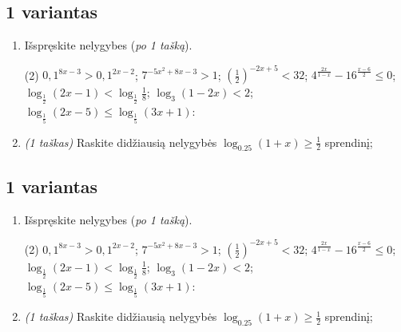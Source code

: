\documentclass[a4paper]{article}
\begin{document}
\vspace*{6mm}

\subsection*{1 variantas}

\begin{enumerate}
      \item Išspręskite nelygybes (\textit{po 1 tašką}).

            \begin{tasks}[item-format={\normalfont}, after-item-skip=2mm](2)
                  \task $0,1^{8x-3}>0,1^{2x-2}$;
                  \task $7^{-5x^2+8x-3}>1$;
                  \task $(\frac{1}{2})^{-2x+5}<32$;
                  \task $4^{\frac{2x}{1-x}}-16^{\frac{x-6}{2}} \leqslant 0$;
                  \task $\log_{\frac{1}{2}}(2x-1)<\log_{\frac{1}{2}}\frac{1}{8}$;
                  \task $\log_{3}(1-2x)<2$;
                  \task $\log_{\frac{1}{5}}(2x-5) \leqslant \log_{\frac{1}{5}}(3x+1)$:
            \end{tasks}

      \item \textit{(1 taškas)} Raskite didžiausią nelygybės $\log_{0.25}(1+x) \geqslant \frac{1}{2}$ sprendinį;

\end{enumerate}

\vspace*{6mm}

\subsection*{1 variantas}

\begin{enumerate}
      \item Išspręskite nelygybes (\textit{po 1 tašką}).

            \begin{tasks}[item-format={\normalfont}, after-item-skip=2mm](2)
                  \task $0,1^{8x-3}>0,1^{2x-2}$;
                  \task $7^{-5x^2+8x-3}>1$;
                  \task $(\frac{1}{2})^{-2x+5}<32$;
                  \task $4^{\frac{2x}{1-x}}-16^{\frac{x-6}{2}} \leqslant 0$;
                  \task $\log_{\frac{1}{2}}(2x-1)<\log_{\frac{1}{2}}\frac{1}{8}$;
                  \task $\log_{3}(1-2x)<2$;
                  \task $\log_{\frac{1}{5}}(2x-5) \leqslant \log_{\frac{1}{5}}(3x+1)$:
            \end{tasks}

      \item \textit{(1 taškas)} Raskite didžiausią nelygybės $\log_{0.25}(1+x) \geqslant \frac{1}{2}$ sprendinį;

\end{enumerate}
\end{document}
